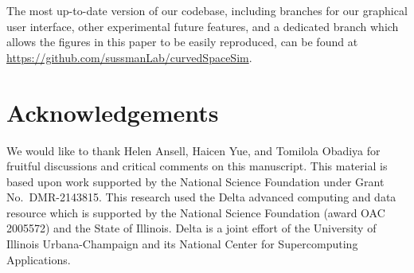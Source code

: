 \documentclass[preprint,12pt]{elsarticle}
\begin{document}
The most up-to-date version of our codebase, including branches for our graphical user interface, other experimental future features, and a dedicated branch which allows the figures in this paper to be easily reproduced, can be found at \url{https://github.com/sussmanLab/curvedSpaceSim}.

\section{Acknowledgements}
We would like to thank Helen Ansell, Haicen Yue, and Tomilola Obadiya for fruitful discussions and critical comments on this manuscript. This material is based upon work supported by the National Science Foundation under Grant No.~DMR-2143815.
This research used the Delta advanced computing and data resource which is supported by the National Science Foundation (award OAC 2005572) and the State of Illinois. Delta is a joint effort of the University of Illinois Urbana-Champaign and its National Center for Supercomputing Applications.














\end{document}

